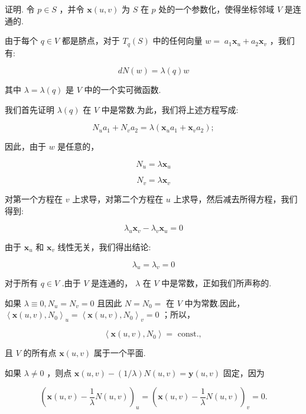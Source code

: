 证明. 令 \(p \in  S\) ，并令 \(\mathbf{x}\left( {u,v}\right)\) 为 \(S\) 在 \(p\) 处的一个参数化，使得坐标邻域 \(V\) 是连通的.

由于每个 \(q \in  V\) 都是脐点，对于 \({T}_{q}\left( S\right)\) 中的任何向量 \(w = \; {a}_{1}{\mathbf{x}}_{u} + {a}_{2}{\mathbf{x}}_{v}\) ，我们有:

\[
{dN}\left( w\right)  = \lambda \left( q\right) w
\]

其中 \(\lambda  = \lambda \left( q\right)\) 是 \(V\) 中的一个实可微函数.

我们首先证明 \(\lambda \left( q\right)\) 在 \(V\) 中是常数.为此，我们将上述方程写成:

\[
{N}_{u}{a}_{1} + {N}_{v}{a}_{2} = \lambda \left( {{\mathbf{x}}_{u}{a}_{1} + {\mathbf{x}}_{v}{a}_{2}}\right) ;
\]

因此，由于 \(w\) 是任意的，

\[
{N}_{u} = \lambda {\mathbf{x}}_{u}
\]

\[
{N}_{v} = \lambda {\mathbf{x}}_{v}
\]

对第一个方程在 \(v\) 上求导，对第二个方程在 \(u\) 上求导，然后减去所得方程，我们得到:

\[
{\lambda }_{u}{\mathbf{x}}_{v} - {\lambda }_{v}{\mathbf{x}}_{u} = 0
\]

由于 \({\mathbf{x}}_{u}\) 和 \({\mathbf{x}}_{v}\) 线性无关，我们得出结论:

\[
{\lambda }_{u} = {\lambda }_{v} = 0
\]

对于所有 \(q \in  V\) .由于 \(V\) 是连通的， \(\lambda\) 在 \(V\) 中是常数，正如我们所声称的.

如果 \(\lambda  \equiv  0,{N}_{u} = {N}_{v} = 0\) 且因此 \(N = {N}_{0} =\) 在 \(V\) 中为常数.因此， \({\left\langle  \mathbf{x}\left( u,v\right) ,{N}_{0}\right\rangle  }_{u} = {\left\langle  \mathbf{x}\left( u,v\right) ,{N}_{0}\right\rangle  }_{v} = 0\) ；所以，

\[
\left\langle  {\mathbf{x}\left( {u,v}\right) ,{N}_{0}}\right\rangle   = \text{ const., }
\]

且 \(V\) 的所有点 \(\mathbf{x}\left( {u,v}\right)\) 属于一个平面.

如果 \(\lambda  \neq  0\) ，则点 \(\mathbf{x}\left( {u,v}\right)  - \left( {1/\lambda }\right) N\left( {u,v}\right)  = \mathbf{y}\left( {u,v}\right)\) 固定，因为

\[
{\left( \mathbf{x}\left( u,v\right)  - \frac{1}{\lambda }N\left( u,v\right) \right) }_{u} = {\left( \mathbf{x}\left( u,v\right)  - \frac{1}{\lambda }N\left( u,v\right) \right) }_{v} = 0.
\]

